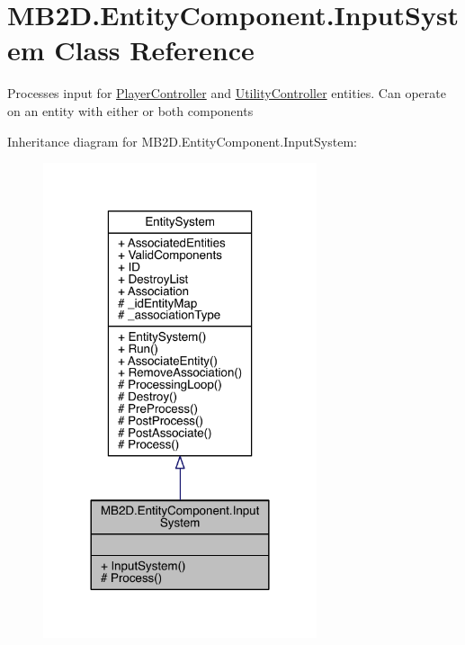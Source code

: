 \hypertarget{class_m_b2_d_1_1_entity_component_1_1_input_system}{}\section{M\+B2\+D.\+Entity\+Component.\+Input\+System Class Reference}
\label{class_m_b2_d_1_1_entity_component_1_1_input_system}


Processes input for \hyperlink{class_m_b2_d_1_1_entity_component_1_1_player_controller}{Player\+Controller} and \hyperlink{class_m_b2_d_1_1_entity_component_1_1_utility_controller}{Utility\+Controller} entities. Can operate on an entity with either or both components  




Inheritance diagram for M\+B2\+D.\+Entity\+Component.\+Input\+System\+:\nopagebreak
\begin{figure}[H]
\begin{center}
\leavevmode
\includegraphics[width=228pt]{class_m_b2_d_1_1_entity_component_1_1_input_system__inherit__graph}
\end{center}
\end{figure}


